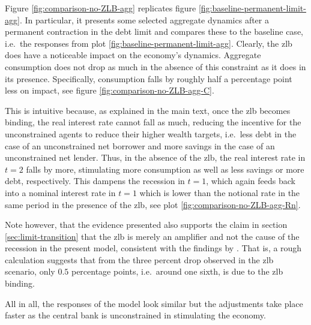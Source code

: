 \documentclass[a4paper,12pt]{article} %
\numberwithin{equation}{section} %
\numberwithin{figure}{section}
\numberwithin{table}{section}
\begin{document}
\begin{refsection}
\begin{appendices}
Figure \ref{fig:comparison-no-ZLB-agg} replicates figure \ref{fig:baseline-permanent-limit-agg}. In particular, it presents some selected aggregate dynamics after a permanent contraction in the debt limit and compares these to the baseline case, i.e.~the responses from plot \ref{fig:baseline-permanent-limit-agg}. Clearly, the \Gls{zlb} does have a noticeable impact on the economy's dynamics. Aggregate consumption does not drop as much in the absence of this constraint as it does in its presence. Specifically, consumption falls by roughly half a percentage point less on impact, see figure \ref{fig:comparison-no-ZLB-agg-C}.

This is intuitive because, as explained in the main text, once the \Gls{zlb} becomes binding, the real interest rate cannot fall as much, reducing the incentive for the unconstrained agents to reduce their higher wealth targets, i.e.~less debt in the case of an unconstrained net borrower and more savings in the case of an unconstrained net lender. Thus, in the absence of the \Gls{zlb}, the real interest rate in $t=2$ falls by more, stimulating more consumption as well as less savings or more debt, respectively. This dampens the recession in $t=1$, which again feeds back into a nominal interest rate in $t=1$ which is lower than the notional rate in the same period in the presence of the \Gls{zlb}, see plot \ref{fig:comparison-no-ZLB-agg-Rn}.

Note however, that the evidence presented also supports the claim in section \ref{sec:limit-transition} that the \Gls{zlb} is merely an amplifier and not the cause of the recession in the present model, consistent with the findings by \textcite{gl2017}. That is, a rough calculation suggests that from the three percent drop observed in the \Gls{zlb} scenario, only $0.5$ percentage points, i.e.~around one sixth, is due to the \Gls{zlb} binding.

All in all, the responses of the model look similar but the adjustments take place faster as the central bank is unconstrained in stimulating the economy. 


\end{appendices}
\end{refsection}
\end{document}

